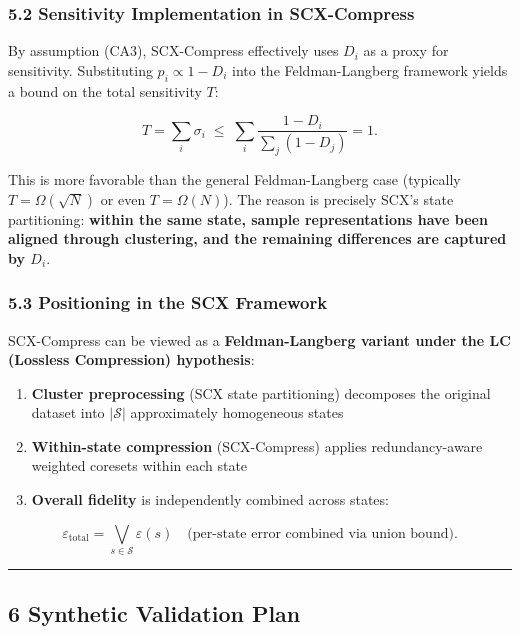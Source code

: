 \documentclass[
  12pt,
]{article}
\providecommand{\tightlist}{%
  \setlength{\itemsep}{0pt}\setlength{\parskip}{0pt}}
\begin{document}
\subsubsection{5.2 Sensitivity Implementation in SCX-Compress}\label{scx-compress-sensitivity}

By assumption (CA3), SCX-Compress effectively uses \(D_i\) as a proxy for sensitivity. Substituting
\(p_i \propto 1 - D_i\) into the Feldman-Langberg framework yields a bound on the total sensitivity \(T\):

\[
T = \sum_i \sigma_i \;\leq\; \sum_i \frac{1 - D_i}{\sum_j (1 - D_j)} = 1.
\]

This is more favorable than the general Feldman-Langberg case (typically \(T = \Omega(\sqrt{N})\) or even
\(T = \Omega(N)\)). The reason is precisely SCX's state partitioning: \textbf{within the same state, sample representations have been aligned through clustering, and the remaining differences are captured by \(D_i\)}.

\subsubsection{5.3 Positioning in the SCX Framework}\label{positioning-scx-framework}

SCX-Compress can be viewed as a \textbf{Feldman-Langberg variant under the LC (Lossless Compression) hypothesis}:

\begin{enumerate}
\def\labelenumi{\arabic{enumi}.}
\tightlist
\item
  \textbf{Cluster preprocessing} (SCX state partitioning) decomposes the original dataset into
  \(|\mathcal{S}|\) approximately homogeneous states
\item
  \textbf{Within-state compression} (SCX-Compress) applies redundancy-aware weighted
  coresets within each state
\item
  \textbf{Overall fidelity} is independently combined across states:
\end{enumerate}

\[
\varepsilon_{\text{total}} = \bigvee_{s \in \mathcal{S}} \varepsilon(s) \quad \text{(per-state error combined via union bound)}.
\]

\begin{center}\rule{0.5\linewidth}{0.5pt}\end{center}

\subsection{6 Synthetic Validation Plan}\label{synthetic-validation-plan}
\end{document}
